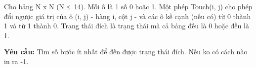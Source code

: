 Cho bảng N x N (N ≤ 14). Mỗi ô là 1 số 0 hoặc 1. Một phép Touch(i, j) cho phép đổi ngược giá trị của ô (i, j) - hàng i, cột j - và các ô kề cạnh (nếu có) từ 0 thành 1 và từ 1 thành 0. Trạng thái đích là trạng thái mà cả bảng đều là 0 hoặc đều là 1.  

\textbf{    Yêu cầu:   }   Tìm số bước ít nhất để đến được trạng thái đích. Nếu ko có cách nào in ra -1.  

\